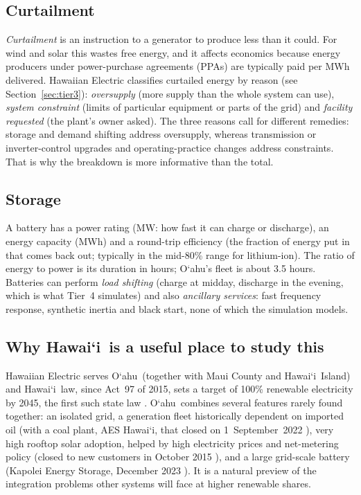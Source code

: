\documentclass[11pt,a4paper]{article}
\newcommand{\okina}{\textquoteleft}
\newcommand{\Oahu}{\texorpdfstring{O\okina ahu}{Oahu}}
\newcommand{\Hawaii}{\texorpdfstring{Hawai\okina i}{Hawaii}}
\begin{document}
\subsection{Curtailment}
\emph{Curtailment} is an instruction to a generator to produce less than it could. For wind and solar this
wastes free energy, and it affects economics because energy producers under power-purchase agreements (PPAs)
are typically paid per MWh delivered. Hawaiian Electric classifies curtailed energy by reason (see
Section~\ref{sec:tier3}): \emph{oversupply} (more supply than the whole system can use), \emph{system
constraint} (limits of particular equipment or parts of the grid) and \emph{facility requested} (the plant's owner
asked). The three reasons call for different remedies: storage and demand shifting address oversupply, whereas
transmission or inverter-control upgrades and operating-practice changes address constraints. That is why the
breakdown is more informative than the total.

\subsection{Storage}
A battery has a power rating (MW: how fast it can charge or discharge), an energy capacity (MWh) and a
round-trip efficiency (the fraction of energy put in that comes back out; typically in the mid-80\% range for
lithium-ion). The ratio of energy to power is its duration in hours; \Oahu's fleet is about 3.5 hours. Batteries
can perform \emph{load shifting} (charge at midday, discharge in the evening, which is what Tier~4 simulates) and
also \emph{ancillary services}: fast frequency response, synthetic inertia and black start, none of which the
simulation models.

\subsection{Why \Hawaii\ is a useful place to study this}
Hawaiian Electric serves \Oahu\ (together with Maui County and \Hawaii\ Island) and \Hawaii\ law, since Act~97 of
2015, sets a target of 100\% renewable electricity by 2045, the first such state law
\cite{utilitydive-act97}. \Oahu\ combines several features rarely found together: an isolated grid, a generation
fleet historically dependent on imported oil (with a coal plant, AES Hawai\okina i, that closed on
1~September~2022 \cite{hpr-coal}), very high rooftop solar adoption, helped by high electricity prices and
net-metering policy (closed to new customers in October 2015 \cite{pvmag-netmetering}), and a large grid-scale
battery (Kapolei Energy Storage, December 2023 \cite{utilitydive-kapolei}). It is
a natural preview of the integration problems other systems will face at higher renewable shares.
\end{document}
